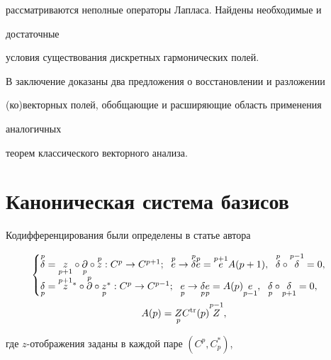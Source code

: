 рассматриваются неполные операторы Лапласа. Найдены необходимые и 


достаточные 


условия существования дискретных гармонических полей. 


В заключение доказаны два предложения о восстановлении и разложении  


(ко)векторных полей, обобщающие и расширяющие область применения 


аналогичных 


теорем классического векторного анализа.  


\setcounter{section}{6} 


 


\section{Каноническая система базисов} 


 


Кодифференцирования были определены в статье автора \cite{2} 


\begin{gather} 


\begin{cases} 


\up{p}{\delta}=\down{p+1}{z}\circ\down{p}{\partial}\circ 


\up{p}{z}:C^p\to C^{p+1};\ \; \up{p}{e}\to\up{p}{\delta} 


\up{p}{e}=\up{p+1}{e}A(p+1),\ \; \up{p}{\delta}\circ 


\up{p-1}{\delta}=0,\\ 


% 


\down{p}{\delta}=\up{p+1}{z}{}^*\circ\up{p}{\partial}\circ 


\down{p}{z}{}^*:C^p\to C^{p-1};\ \; \down{p}{e}\to\down{p}{\delta} 


\down{p}{e}=A(p)\down{p-1}{e},\ \; \down{p}{\delta}\circ 


\down{p+1}{\delta}=0,


\end{cases} 


\\ 


A(p)=\down{p}{Z}C^{\tr}(p)\up{p-1}{Z},\notag 


\end{gather} 


где $z$-отображения заданы в каждой паре $(C^p,C^*_p)$, 


